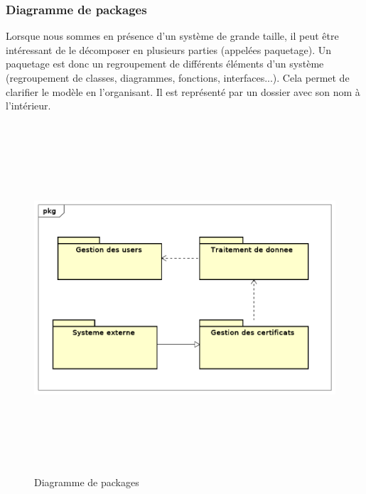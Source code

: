 		\subsubsection{Diagramme de packages}
		Lorsque nous sommes en présence d’un système de grande taille, il peut être intéressant de le décomposer en plusieurs parties (appelées paquetage).
Un paquetage est donc un regroupement de différents éléments d’un système (regroupement de
classes, diagrammes, fonctions, interfaces...). Cela permet de clarifier le modèle en l’organisant. Il est représenté par un dossier avec son nom à l’intérieur.
				\begin{figure}[H]
					\centering
					\includegraphics[width=18cm, height=13cm]{../Diagrammes/DigrammeClass/diagrammepackage.png}
					\caption{Diagramme de packages}
					\label{diapackage}
			\end{figure}
		

